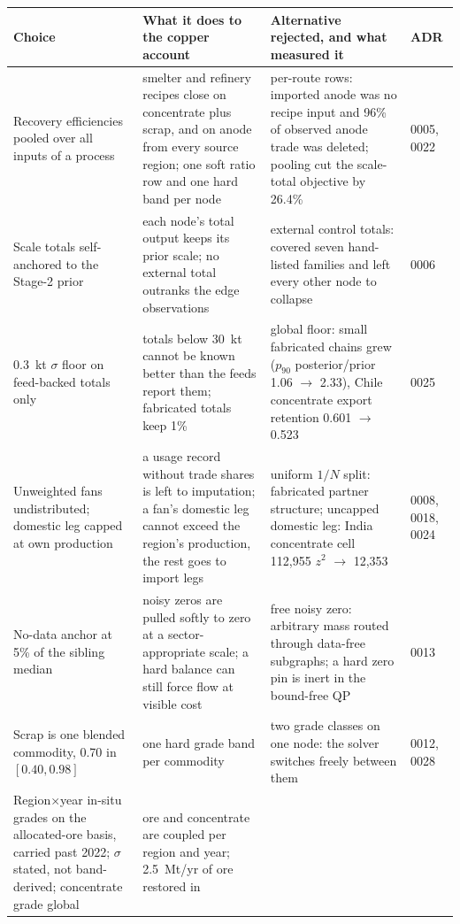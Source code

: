 \begin{table}[t]
\centering\footnotesize
\setlength{\tabcolsep}{3pt}
\begin{tabular}{@{}p{3.2cm}p{5.1cm}p{5.9cm}p{1.2cm}@{}}
\toprule
Choice & What it does to the copper account & Alternative rejected, and what
measured it & ADR \\
\midrule
Recovery efficiencies pooled over all inputs of a process & smelter and
refinery recipes close on concentrate plus scrap, and on anode from every
source region; one soft ratio row and one hard band per node & per-route
rows: imported anode was no recipe input and 96\% of observed anode trade was
deleted; pooling cut the scale-total objective by 26.4\% & 0005, 0022 \\[2pt]
Scale totals self-anchored to the Stage-2 prior & each node's total output
keeps its prior scale; no external total outranks the edge observations &
external control totals: covered seven hand-listed families and left every
other node to collapse & 0006 \\[2pt]
0.3~kt $\sigma$ floor on feed-backed totals only & totals below 30~kt cannot
be known better than the feeds report them; fabricated totals keep 1\% &
global floor: small fabricated chains grew ($p_{90}$ posterior/prior 1.06
$\to$ 2.33), Chile concentrate export retention 0.601 $\to$ 0.523 & 0025 \\[2pt]
Unweighted fans undistributed; domestic leg capped at own production & a
usage record without trade shares is left to imputation; a fan's domestic leg
cannot exceed the region's production, the rest goes to import legs &
uniform $1/N$ split: fabricated partner structure; uncapped domestic leg:
India concentrate cell 112{,}955 $z^2$ $\to$ 12{,}353 & 0008, 0018,
0024 \\[2pt]
No-data anchor at 5\% of the sibling median & noisy zeros are pulled softly
to zero at a sector-appropriate scale; a hard balance can still force flow
at visible cost & free noisy zero: arbitrary mass routed through data-free
subgraphs; a hard zero pin is inert in the bound-free QP & 0013 \\[2pt]
Scrap is one blended commodity, 0.70 in $[0.40, 0.98]$ & one hard grade band
per commodity & two grade classes on one node: the solver switches freely
between them & 0012, 0028 \\[2pt]
Region$\times$year in-situ grades on the allocated-ore basis, carried past
2022; $\sigma$ stated, not band-derived; concentrate grade global & ore and
concentrate are coupled per region and year; 2.5~Mt/yr of ore restored in

\end{tabular}
\end{table}
